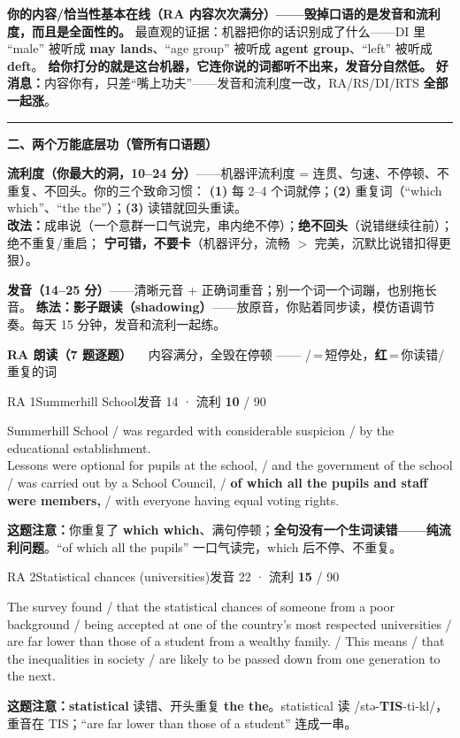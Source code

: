 \documentclass[11pt]{article}
\newcommand{\szero}[1]{\textcolor{cWrong}{\bfseries #1}}
\newcommand{\hl}[1]{\textcolor{cWrong}{\bfseries #1}}   %
\newcommand{\ptesub}[1]{%
  \par\needspace{2\baselineskip}\smallskip
  {\color{cAccent}\rule[-0.2ex]{3pt}{1.05em}}\hspace{6pt}%
  {\bfseries\color{cHead}#1}\par\nopagebreak\smallskip}
\newcommand{\ptetask}[2]{%
  \needspace{4\baselineskip}\medskip
  \begin{tcolorbox}[enhanced, colback=cHead, colframe=cHead, sharp corners,
     left=12pt, right=12pt, top=5pt, bottom=5pt, boxrule=0pt]
    {\large\bfseries\color{white} #1}\ \ {\color{white!80} #2}
  \end{tcolorbox}\smallskip}
\begin{document}
\textbf{你的内容/恰当性基本在线（RA 内容次次满分）——毁掉口语的是发音和流利度，而且是全面性的。}
最直观的证据：机器把你的话识别成了什么——DI 里 ``male'' 被听成 \hl{may lands}、``age group'' 被听成 \hl{agent group}、``left'' 被听成 \hl{deft}。
\textbf{给你打分的就是这台机器，它连你说的词都听不出来，发音分自然低。}
\textbf{好消息：}内容你有，只差“嘴上功夫”——发音和流利度一改，RA/RS/DI/RTS \textbf{全部一起涨}。

\ptesub{二、两个万能底层功（管所有口语题）}

\begin{notebox}\small
\textbf{流利度（你最大的洞，10–24 分）}——机器评流利度 = 连贯、匀速、不停顿、不重复、不回头。你的三个致命习惯：
\textbf{(1)} 每 2–4 个词就停；\textbf{(2)} 重复词（``which which''、``the the''）；\textbf{(3)} 读错就回头重读。\\
\textbf{改法：}成串说（一个意群一口气说完，串内绝不停）；\textbf{绝不回头}（说错继续往前）；绝不重复/重启；
\textbf{宁可错，不要卡}（机器评分，流畅 $>$ 完美，沉默比说错扣得更狠）。
\end{notebox}

\begin{notebox}\small
\textbf{发音（14–25 分）}——清晰元音 + 正确词重音；别一个词一个词蹦，也别拖长音。
\textbf{练法：影子跟读（shadowing）}——放原音，你贴着同步读，模仿语调节奏。每天 15 分钟，发音和流利一起练。
\end{notebox}

\ptetask{RA 朗读（7 题逐题）}{内容满分，全毁在停顿 —— /\,=\,短停处，\hl{红}\,=\,你读错/重复的词}

\begin{qblock}{RA 1\quad Summerhill School}{发音 14 · 流利 \szero{10} / 90}
\begin{promptbox}\small
Summerhill School / was regarded with considerable suspicion / by the educational establishment. \\ Lessons were optional for pupils at the school, / and the government of the school / was carried out by a School Council, / \textbf{of which all the pupils and staff were members,} / with everyone having equal voting rights.
\end{promptbox}
\textbf{这题注意：}你重复了 \hl{which which}、满句停顿；\textbf{全句没有一个生词读错——纯流利问题}。``of which all the pupils'' 一口气读完，which 后不停、不重复。
\end{qblock}

\begin{qblock}{RA 2\quad Statistical chances (universities)}{发音 22 · 流利 \szero{15} / 90}
\begin{promptbox}\small
The survey found / that the statistical chances of someone from a poor background / being accepted at one of the country's most respected universities / are far lower than those of a student from a wealthy family. / This means / that the inequalities in society / are likely to be passed down from one generation to the next.
\end{promptbox}
\textbf{这题注意：}\hl{statistical} 读错、开头重复 \hl{the the}。statistical 读 /stə-\textbf{TIS}-ti-kl/，重音在 TIS；``are far lower than those of a student'' 连成一串。
\end{qblock}
\end{document}
